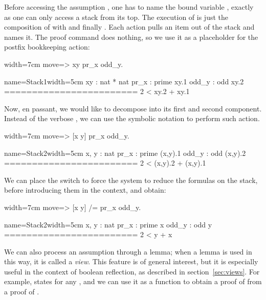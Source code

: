 Before accessing the assumption , one has to name the
bound variable , exactly as one can only access a stack from its top.
The execution of  is just the composition of
 with  and finally .  Each action
pulls an item out of the stack and names it.  The  proof
command does nothing, so we use it as a placeholder
for the postfix \C{=>} bookkeeping action:

\begin{coq-left}{}{width=7cm}
move=> xy pr_x odd_y.
$~$
$~$
$~$
$~$
\end{coq-left}
\begin{coqout-right}{name=Stack1}{width=5cm}
 xy : nat * nat
 pr_x : prime xy.1
 odd_y : odd xy.2
========================
 2 < xy.2 + xy.1
\end{coqout-right}

Now, en passant, we would like to decompose  into its first
and second component.  Instead of the verbose ,
we can use the symbolic notation \C{[]} to perform such action.

\begin{coq-left}{}{width=7cm}
move=> [x y] pr_x odd_y.
$~$
$~$
$~$
$~$
\end{coq-left}
\begin{coqout-right}{name=Stack2}{width=5cm}
 x, y : nat
 pr_x : prime (x,y).1
 odd_y : odd (x,y).2
========================
 2 < (x,y).2 + (x,y).1
\end{coqout-right}

We can place the \C{/=} switch to force the system to reduce the formulas on
the stack, before introducing them in the context, and obtain:

\begin{coq-left}{}{width=7cm}
move=> [x y] /= pr_x odd_y.
$~$
$~$
$~$
$~$
\end{coq-left}
\begin{coqout-right}{name=Stack2}{width=5cm}
 x, y : nat
 pr_x : prime x
 odd_y : odd y
========================
 2 < y + x
\end{coqout-right}

We can also process an assumption through a lemma; when a lemma is
used in this way, it is called a \emph{view}. This feature is of
general interest, but it is especially useful in the context of boolean
reflection, as described in section~\ref{sec:views}. For example,
 states  for any , and we can
use it as a function to obtain a proof of   from a proof
of .


